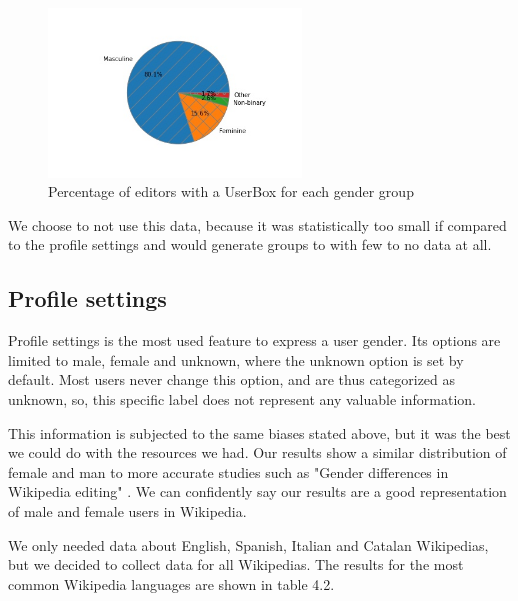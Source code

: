 \begin{figure}[H]
    \centering
    \includegraphics[width=0.6\textwidth]{./img/userbox.jpg}
    \caption{Percentage of editors with a UserBox for each gender group}
    \label{fig:userbox}
\end{figure}

We choose to not use this data, because it was statistically too small if compared to the profile settings and would generate groups to with few to no data at all.

\subsection{Profile settings}
\label{sec:resprofilesettings}
Profile settings is the most used feature to express a user gender. Its options are limited to male, female and unknown, where the unknown option is set by default. Most users never change this option, and are thus categorized as unknown, so, this specific label does not represent any valuable information.

This information is subjected to the same biases stated above, but it was the best we could do with the resources we had. Our results show a similar distribution of female and man to more accurate studies such as "Gender differences in Wikipedia editing" \cite{antin2011gender}. We can confidently say our results are a good representation of male and female users in Wikipedia.

We only needed data about English, Spanish, Italian and Catalan Wikipedias, but we decided to collect data for all Wikipedias. The results for the most common Wikipedia languages are shown in table 4.2.

